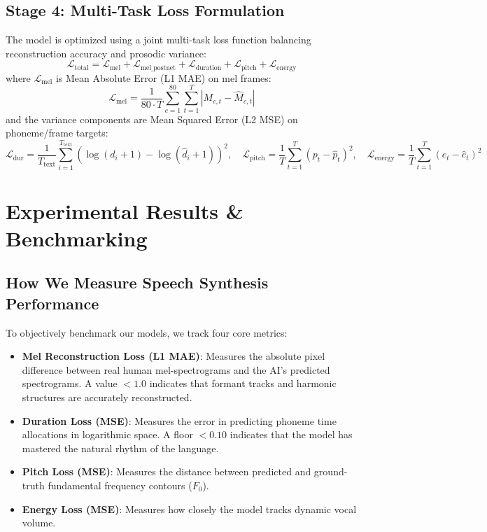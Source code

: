 \documentclass[11pt,a4paper]{article}
\begin{document}
\subsection{Stage 4: Multi-Task Loss Formulation}
The model is optimized using a joint multi-task loss function balancing reconstruction accuracy and prosodic variance:
\begin{equation}
\mathcal{L}_{\text{total}} = \mathcal{L}_{\text{mel}} + \mathcal{L}_{\text{mel\_postnet}} + \mathcal{L}_{\text{duration}} + \mathcal{L}_{\text{pitch}} + \mathcal{L}_{\text{energy}}
\end{equation}
where $\mathcal{L}_{\text{mel}}$ is Mean Absolute Error (L1 MAE) on mel frames:
\begin{equation}
\mathcal{L}_{\text{mel}} = \frac{1}{80 \cdot T} \sum_{c=1}^{80} \sum_{t=1}^{T} | M_{c, t} - \hat{M}_{c, t} |
\end{equation}
and the variance components are Mean Squared Error (L2 MSE) on phoneme/frame targets:
\begin{equation}
\mathcal{L}_{\text{dur}} = \frac{1}{T_{\text{text}}} \sum_{i=1}^{T_{\text{text}}} (\log(d_i + 1) - \log(\hat{d}_i + 1))^2, \quad \mathcal{L}_{\text{pitch}} = \frac{1}{T} \sum_{t=1}^{T} (p_t - \hat{p}_t)^2, \quad \mathcal{L}_{\text{energy}} = \frac{1}{T} \sum_{t=1}^{T} (e_t - \hat{e}_t)^2
\end{equation}

\newpage

\section{Experimental Results \& Benchmarking}

\subsection{How We Measure Speech Synthesis Performance}
To objectively benchmark our models, we track four core metrics:
\begin{itemize}
  \item \textbf{Mel Reconstruction Loss (L1 MAE)}: Measures the absolute pixel difference between real human mel-spectrograms and the AI's predicted spectrograms. A value $<1.0$ indicates that formant tracks and harmonic structures are accurately reconstructed.
  \item \textbf{Duration Loss (MSE)}: Measures the error in predicting phoneme time allocations in logarithmic space. A floor $<0.10$ indicates that the model has mastered the natural rhythm of the language.
  \item \textbf{Pitch Loss (MSE)}: Measures the distance between predicted and ground-truth fundamental frequency contours ($F_0$).
  \item \textbf{Energy Loss (MSE)}: Measures how closely the model tracks dynamic vocal volume.
\end{itemize}
\end{document}
